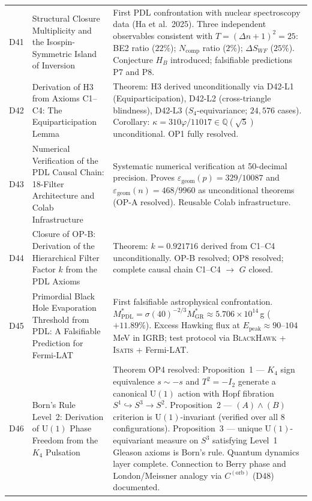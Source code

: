 \documentclass[11pt,a4paper]{article}
\theoremstyle{plain}
\theoremstyle{definition}
\theoremstyle{remark}
\begin{document}
\begin{longtable}{L{1.3cm}L{3.8cm}L{8.0cm}}
D41 & Structural Closure Multiplicity and the Isospin-Symmetric Island of Inversion~\cite{D41} & First PDL confrontation with nuclear spectroscopy data (Ha et al.~2025). Three independent observables consistent with $T=(\Delta n+1)^2=25$: BE2 ratio ($22\%$); $N_{\mathrm{comp}}$ ratio ($2\%$); $\Delta S_{WF}$ ($25\%$). Conjecture $H_B$ introduced; falsifiable predictions P7 and P8.\\[0.4em]
D42 & Derivation of H3 from Axioms C1--C4: The Equiparticipation Lemma~\cite{D42} & \textcolor{proofblue}{Theorem}: H3 derived unconditionally via D42-L1 (Equiparticipation), D42-L2 (cross-triangle blindness), D42-L3 ($S_4$-equivariance; $24{,}576$ cases). Corollary: $\kappa=310\varphi/11017\in\mathbb{Q}(\sqrt{5})$ unconditional. OP1 fully resolved.\\[0.4em]
D43 & Numerical Verification of the PDL Causal Chain: 18-Filter Architecture and Colab Infrastructure~\cite{D43} & Systematic numerical verification at 50-decimal precision. Proves $\varepsilon_{\mathrm{geom}}(p) = 329/10087$ and $\varepsilon_{\mathrm{geom}}(n) = 468/9960$ as unconditional theorems (OP-A resolved). Reusable Colab infrastructure.\\[0.4em]
D44 & Closure of OP-B: Derivation of the Hierarchical Filter Factor $k$ from the PDL Axioms~\cite{D44} & \textcolor{proofblue}{Theorem}: $k = 0.921716$ derived from C1--C4 unconditionally. OP-B resolved; OP8 resolved; complete causal chain C1--C4 $\to$ $G$ closed.\\[0.4em]
D45 & Primordial Black Hole Evaporation Threshold from PDL: A Falsifiable Prediction for Fermi-LAT~\cite{D45} & First falsifiable astrophysical confrontation. $M^*_{\mathrm{PDL}} = \sigma(40)^{-2/3} M^*_{\mathrm{GR}} \approx 5.706 \times 10^{14}$\,g ($+11.89\%$). Excess Hawking flux at $E_{\mathrm{peak}} \approx 90$--$104$\,MeV in IGRB; test protocol via \textsc{BlackHawk} + \textsc{Isatis} + Fermi-LAT.\\[0.4em]
D46 & Born's Rule Level~2: Derivation of $\mathrm{U}(1)$ Phase Freedom from the $K_4$ Pulsation~\cite{D46} & \textcolor{proofblue}{Theorem} OP4 resolved: Proposition~1 — $K_4$ sign equivalence $s \sim -s$ and $T^2=-I_2$ generate a canonical $\mathrm{U}(1)$ action with Hopf fibration $S^1\hookrightarrow S^3\to S^2$. Proposition~2 — $(A)\wedge(B)$ criterion is $\mathrm{U}(1)$-invariant (verified over all 8 configurations). Proposition~3 — unique $\mathrm{U}(1)$-equivariant measure on $S^3$ satisfying Level~1 Gleason axioms is Born's rule. Quantum dynamics layer complete. Connection to Berry phase and London/Meissner analogy via $C^{(\mathrm{orb})}$ (D48) documented.\\[0.4em]

\end{longtable}
\end{document}
